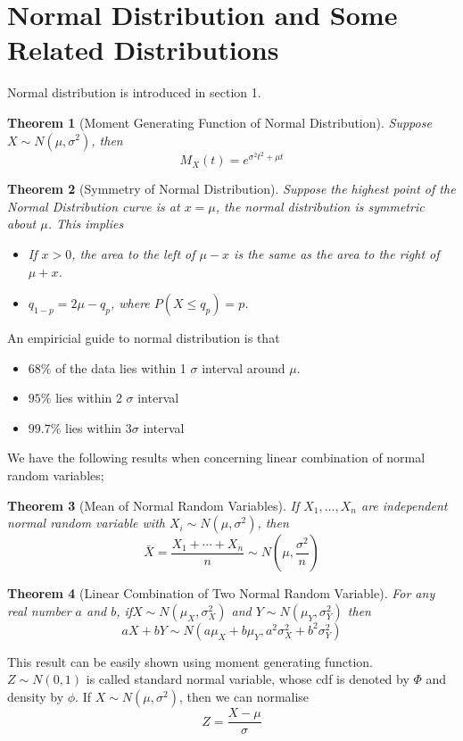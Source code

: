 \documentclass[12pt]{article}
\newtheorem{theorem}{Theorem}[section]
\theoremstyle{definition}
\begin{document}
\section{Normal Distribution and Some Related Distributions}
Normal distribution is introduced in section 1. 
\begin{theorem}[Moment Generating Function of Normal Distribution]
\normalfont Suppose $X\sim N(\mu, \sigma^2)$, then
\[
M_X(t) = e^{\sigma^2t^2+\mu t}
\]
\end{theorem}
\begin{theorem}[Symmetry of Normal Distribution]
\normalfont Suppose the highest point of the Normal Distribution curve is at $x=\mu$, the normal distribution is symmetric about $\mu$. This implies
\begin{itemize}
  \item If $x>0$, the area to the left of $\mu-x$ is the same as the area to the right of $\mu+x$.
  \item $q_{1-p} = 2\mu-q_p$, where $P(X\leq q_p) = p$.
\end{itemize}
\end{theorem}
An empiricial guide to normal distribution is that 
\begin{itemize}
  \item $68\%$ of the data lies within 1 $\sigma$ interval around $\mu$.
  \item $95\%$ lies within 2 $\sigma$ interval
  \item $99.7\%$ lies within 3$\sigma$ interval
\end{itemize}
We have the following results when concerning linear combination of normal random variables;
\begin{theorem}[Mean of Normal Random Variables]
\normalfont If $X_1,\ldots, X_n$ are independent normal random variable with $X_i\sim N(\mu, \sigma^2)$, then
\[
\bar{X} = \frac{X_1+\cdots+X_n}{n} \sim N(\mu, \frac{\sigma^2}{n})
\]
\end{theorem}
\begin{theorem}[Linear Combination of Two Normal Random Variable]
\normalfont For any real number $a$ and $b$, if$X\sim N(\mu_X, \sigma_X^2)$ and $Y\sim N(\mu_Y, \sigma_Y^2)$ then
\[
aX+bY\sim N(a\mu_X+b\mu_Y, a^2\sigma_X^2+b^2\sigma_Y^2)
\]
\end{theorem}
This result can be easily shown using moment generating function.\\
$Z\sim N(0,1)$ is called standard normal variable, whose cdf is denoted by $\Phi$ and density by $\phi$. If $X\sim N(\mu, \sigma^2)$, then we can normalise
\[
Z=\frac{X-\mu}{\sigma}
\]
\end{document}
